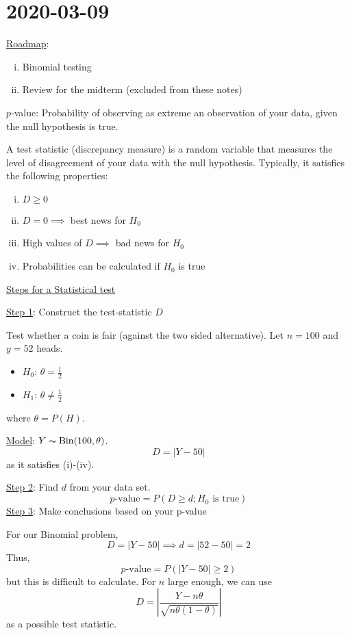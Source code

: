 \section{2020-03-09}
\underline{Roadmap}:
\begin{enumerate}[(i)]
    \item Binomial testing
    \item Review for the midterm (excluded from these notes)
\end{enumerate}
\begin{defbox}
    \begin{definition}
        $ p $-value: Probability of observing as extreme an observation of your data,
        given the null hypothesis is true.
    \end{definition}
\end{defbox}

\begin{defbox}
    \begin{definition}
        A test statistic (discrepancy measure) is a random variable that measures
        the level of disagreement of your data with the null hypothesis. Typically,
        it satisfies the following properties:
        \begin{enumerate}[(i)]
            \item $ D\geqslant 0 $
            \item $ D=0 \implies $ best news for $ H_0 $
            \item High values of $ D \implies $ bad news for $ H_0 $
            \item Probabilities can be calculated if $ H_0 $ is true
        \end{enumerate}
    \end{definition}
\end{defbox}

\underline{Steps for a Statistical test}

\underline{Step 1}: Construct the test-statistic $ D $
\begin{exbox}
    \begin{example}
        Test whether a coin is fair (against the two sided alternative).
        Let $ n=100 $ and $ y=52 $ heads.
        \begin{itemize}
            \item $ H_0 $: $ \theta=\frac{1}{2} $
            \item $ H_1 $: $ \theta\neq \frac{1}{2} $
        \end{itemize}
        where $ \theta=P(H) $.

        \underline{Model}: $ Y \thicksim \operatorname{Bin}(100,\theta) $.
        \[ D=|Y-50| \]
        as it satisfies (i)-(iv).
    \end{example}
\end{exbox}
\underline{Step 2}: Find $ d $ from your data set.
\[ p\text{-value}=P(D\geqslant d;H_0\text{ is true}) \]
\underline{Step 3}: Make conclusions based on your p-value

For our Binomial problem,
\[ D=|Y-50|\implies d=|52-50|=2 \]
Thus,
\[ p\text{-value}=P(|Y-50|\geqslant 2) \]
but this is difficult to calculate. For $ n $ large enough, we can use
\[ D=\left| \frac{Y-n\theta}{\sqrt{n\theta(1-\theta)}} \right| \]
as a possible test statistic.

